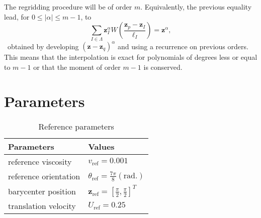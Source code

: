 The regridding procedure will be of order $m$. Equivalently, the previous equality lead, for $0 \leq |\alpha| \leq m - 1$, to
\begin{equation*}
    \sum_{I \in \Lambda} \bm z_I^\alpha W \left(\frac{\bm z_p - \bm z_I}{\ell_I} \right) = \bm z^\alpha,
\end{equation*}~obtained by developing ${(\bm z-\bm z_q)}^\alpha$ and using a recurrence on previous orders. This means that the interpolation is exact for polynomials of degrees less or equal to $m-1$ or that the moment of order $m-1$ is conserved.

\section{Parameters}
\label{appendix:simulation-parameters}
\begin{table}[htbp]
    \centering
    \caption{Reference parameters}
    \begin{tabular}{|l|l|}
        \hline
        Parameters            & Values                                                       \\
        \hline
        reference viscosity   & $v_{\text{ref}} = 0.001$                                     \\
        reference orientation & $\theta_{\text{ref}}  = \frac{7 \pi}{8} (\text{rad.})$       \\
        barycenter position   & $\bm{z}_{\text{ref}} = \left[\frac\pi2, \frac\pi2 \right]^T$ \\
        translation velocity  & $U_{\text{ref}} = 0.25$                                      \\
        \hline
    \end{tabular}
    \label{tab:ref}
\end{table}

